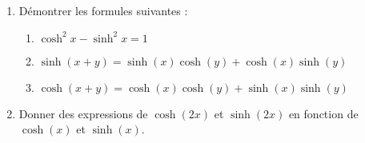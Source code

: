 
\begin{exercice}\label{exoautoanalyseCTU-13}



\begin{enumerate}
\item Démontrer les formules suivantes :
\begin{enumerate}
\item $\cosh^2 x - \sinh^2 x = 1$
\item $\sinh (x+y)=\sinh(x) \cosh(y)+\cosh(x)\sinh(y)$
\item $\cosh (x+y)=\cosh(x) \cosh(y)+\sinh(x)\sinh(y)$
\end{enumerate}
\item Donner des expressions de $\cosh(2x)$ et $\sinh(2x)$  en fonction de $\cosh(x)$ et $\sinh(x)$.
\end{enumerate}




\end{exercice}
